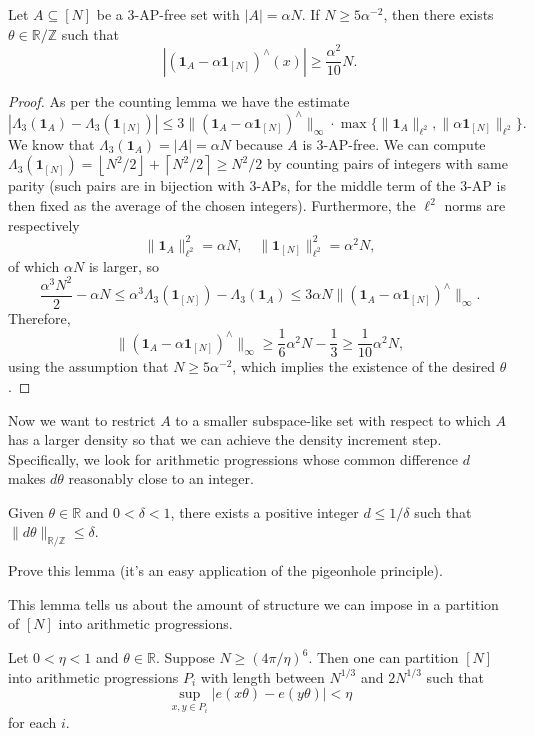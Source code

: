 \documentclass[10pt]{scrartcl}
\providecommand{\RR}{\mathbb R}
\providecommand{\ZZ}{\mathbb Z}
\providecommand{\ind}[1]{\mathbf 1_{#1}}
\providecommand{\norm}[1]{\| #1 \|}
\providecommand{\floor}[1]{\left\lfloor #1\right\rfloor}
\providecommand{\ceil}[1]{\left\lceil #1\right\rceil}
\begin{document}
\begin{lemma}
	Let $A\subseteq [N]$ be a 3-AP-free set with $|A| = \alpha N$.
	If $N\ge 5\alpha^{-2}$, then there exists $\theta\in\RR/\ZZ$ such that
	\[|(\ind A - \alpha\ind{[N]})^\wedge(x)| \ge \frac{\alpha^2}{10}N.\]
\end{lemma}

\begin{proof}
	As per the counting lemma we have the estimate
	\[|\Lambda_3(\ind A) - \Lambda_3(\ind{[N]})|\le
	3\norm{(\ind A-\alpha\ind{[N]})^\wedge}_\infty
	\cdot \max\{\norm{\ind A}_{\ell^2},\norm{\alpha\ind{[N]}}_{\ell^2}\}.\]
	We know that $\Lambda_3(\ind A) = |A| =\alpha N$ because $A$ is 3-AP-free.
	We can compute $\Lambda_3(\ind{[N]}) = \floor{N^2/2}+\ceil{N^2/2}\ge N^2/2$
	by counting pairs of integers with same parity (such pairs
	are in bijection with 3-APs, for the middle term of the 3-AP
	is then fixed as the average of the chosen integers).
	Furthermore, the $\ell^2$ norms are respectively
	\[\norm{\ind A}_{\ell^2}^2 =\alpha N,\quad
	\norm{\ind{[N]}}_{\ell^2}^2 = \alpha^2 N,\]
	of which $\alpha N$ is larger, so
	\[\frac{\alpha^3N^2}{2} - \alpha N\le
	\alpha^3\Lambda_3(\ind{[N]}) - \Lambda_3(\ind A) \le
	3\alpha N\norm{(\ind A - \alpha\ind{[N]})^\wedge}_{\infty}.\]
	Therefore,
	\[\norm{(\ind A - \alpha\ind{[N]})^\wedge}_{\infty}
	\ge \frac{1}{6}\alpha^2N - \frac13 \ge \frac{1}{10}\alpha^2 N,\]
	using the assumption that $N\ge 5\alpha^{-2}$,
	which implies the existence of the desired $\theta$.
\end{proof}

Now we want to restrict $A$ to a smaller subspace-like set
with respect to which $A$ has a larger density so that we can
achieve the density increment step. Specifically, we look for
arithmetic progressions whose common difference $d$ makes $d\theta$
reasonably close to an integer.

\begin{lemma}
	Given $\theta\in\RR$ and $0 < \delta < 1$, there exists
	a positive integer $d \le 1/\delta$ such that
	$\norm{d\theta}_{\RR/\ZZ}\le\delta$.
\end{lemma}

\begin{exercise}
	Prove this lemma (it's an easy application of the pigeonhole principle).
\end{exercise}

This lemma tells us about the amount of structure we can impose
in a partition of $[N]$ into arithmetic progressions.
\begin{lemma}
	Let $0 < \eta < 1$ and $\theta\in\RR$. Suppose $N\ge (4\pi/\eta)^6$.
	Then one can partition $[N]$ into arithmetic progressions
	$P_i$ with length between $N^{1/3}$ and $2N^{1/3}$ such that
	\[\sup_{x,y\in P_i} |e(x\theta) - e(y\theta)| < \eta\]
	for each $i$.
\end{lemma}
\end{document}
